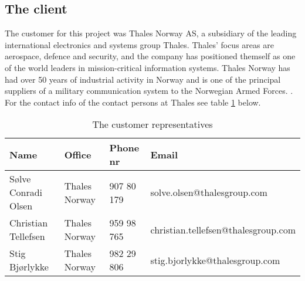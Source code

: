 \subsection{The client}
The customer for this project was Thales Norway AS, a subsidiary of the leading international electronics and systems group Thales. Thales' focus areas are aerospace, defence and security, and the company has positioned themself as one of the world leaders in mission-critical information systems. Thales Norway has had over 50 years of industrial activity in Norway and is one of the principal suppliers of a military communication system to the Norwegian Armed Forces.
\cite{bib:thales}.
\newline
\newline
For the contact info of the contact persons at Thales see table \ref{tab:customer} below.
\begin{table}[h!]
\begin{center}
\begin{tabular}{l|l|l|l}
\hline
\textbf{Name} & \textbf{Office} & \textbf{Phone nr} & \textbf{Email} \\ \hline \hline
Sølve Conradi Olsen & Thales Norway & 907 80 179 & solve.olsen@thalesgroup.com \\ 
Christian Tellefsen & Thales Norway & 959 98 765 & christian.tellefsen@thalesgroup.com \\ 
Stig Bjørlykke & Thales Norway & 982 29 806 & stig.bjorlykke@thalesgroup.com \\ \hline
\end{tabular}
\end{center}
\caption{The customer representatives} \label{tab:customer}
\end{table}

